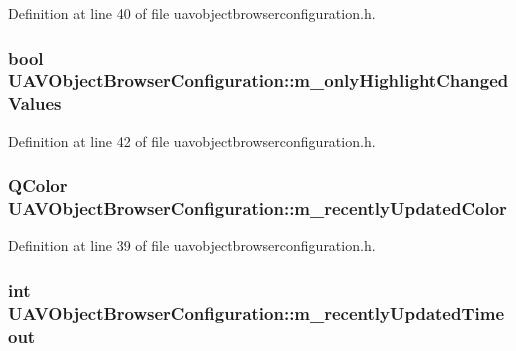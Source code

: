\-Definition at line 40 of file uavobjectbrowserconfiguration.\-h.

\hypertarget{group___u_a_v_object_browser_plugin_ga71cd3f90f89aecf1db0e52927661c9f4}{
\subsubsection[{m\-\_\-only\-Highlight\-Changed\-Values}]{\setlength{\rightskip}{0pt plus 5cm}bool {\bf \-U\-A\-V\-Object\-Browser\-Configuration\-::m\-\_\-only\-Highlight\-Changed\-Values}}}\label{group___u_a_v_object_browser_plugin_ga71cd3f90f89aecf1db0e52927661c9f4}


\-Definition at line 42 of file uavobjectbrowserconfiguration.\-h.

\hypertarget{group___u_a_v_object_browser_plugin_ga37ba368816fa79530f01aa4447c2fc4d}{
\subsubsection[{m\-\_\-recently\-Updated\-Color}]{\setlength{\rightskip}{0pt plus 5cm}\-Q\-Color {\bf \-U\-A\-V\-Object\-Browser\-Configuration\-::m\-\_\-recently\-Updated\-Color}}}\label{group___u_a_v_object_browser_plugin_ga37ba368816fa79530f01aa4447c2fc4d}


\-Definition at line 39 of file uavobjectbrowserconfiguration.\-h.

\hypertarget{group___u_a_v_object_browser_plugin_gabdd8aaa583badc5d3c7545480a372138}{
\subsubsection[{m\-\_\-recently\-Updated\-Timeout}]{\setlength{\rightskip}{0pt plus 5cm}int {\bf \-U\-A\-V\-Object\-Browser\-Configuration\-::m\-\_\-recently\-Updated\-Timeout}}}\label{group___u_a_v_object_browser_plugin_gabdd8aaa583badc5d3c7545480a372138}


